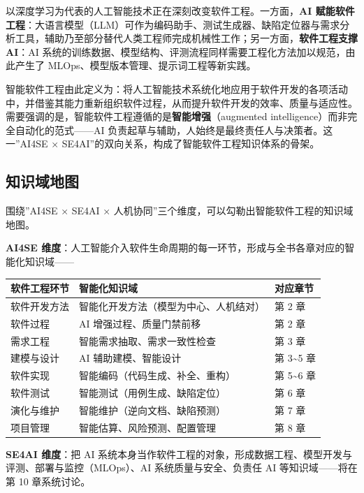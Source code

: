 \documentclass[
]{ctexbook}
\newcounter{none}
\begin{document}
以深度学习为代表的人工智能技术正在深刻改变软件工程。一方面，\textbf{AI
赋能软件工程}：大语言模型（LLM）可作为编码助手、测试生成器、缺陷定位器与需求分析工具，辅助乃至部分替代人类工程师完成机械性工作；另一方面，\textbf{软件工程支撑
AI}：AI
系统的训练数据、模型结构、评测流程同样需要工程化方法加以规范，由此产生了
MLOps、模型版本管理、提示词工程等新实践。

智能软件工程由此定义为：将人工智能技术系统化地应用于软件开发的各项活动中，并借鉴其能力重新组织软件过程，从而提升软件开发的效率、质量与适应性。需要强调的是，智能软件工程遵循的是\textbf{智能增强}（augmented
intelligence）而非完全自动化的范式------AI
负责起草与辅助，人始终是最终责任人与决策者。这一''AI4SE ×
SE4AI''的双向关系，构成了智能软件工程知识体系的骨架。

\subsection{知识域地图}\label{ux77e5ux8bc6ux57dfux5730ux56fe}

围绕''AI4SE × SE4AI ×
人机协同''三个维度，可以勾勒出智能软件工程的知识域地图。

\textbf{AI4SE
维度}：人工智能介入软件生命周期的每一环节，形成与全书各章对应的智能化知识域------

{\def\LTcaptype{none} %
\begin{longtable}[]{@{}lll@{}}
\toprule\noalign{}
软件工程环节 & 智能化知识域 & 对应章节 \\
\midrule\noalign{}
\endhead
\bottomrule\noalign{}
\endlastfoot
软件开发方法 & 智能化开发方法（模型为中心、人机结对） & 第 2 章 \\
软件过程 & AI 增强过程、质量门禁前移 & 第 2 章 \\
需求工程 & 智能需求抽取、需求一致性检查 & 第 3 章 \\
建模与设计 & AI 辅助建模、智能设计 & 第 3\textasciitilde5 章 \\
软件实现 & 智能编码（代码生成、补全、重构） & 第 5\textasciitilde6 章 \\
软件测试 & 智能测试（用例生成、缺陷定位） & 第 6 章 \\
演化与维护 & 智能维护（逆向文档、缺陷预测） & 第 7 章 \\
项目管理 & 智能估算、风险预测、配置管理 & 第 8 章 \\
\end{longtable}
}

\textbf{SE4AI 维度}：把 AI
系统本身当作软件工程的对象，形成数据工程、模型开发与评测、部署与监控（MLOps）、AI
系统质量与安全、负责任 AI 等知识域------将在第 10 章系统讨论。
\end{document}
